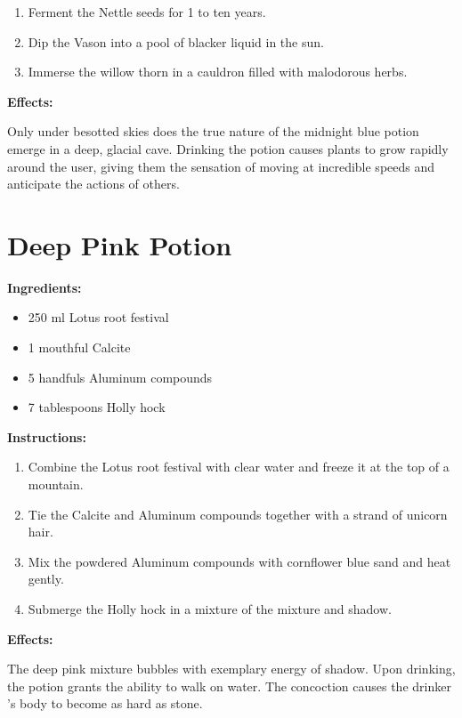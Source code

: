 \documentclass{article}
\begin{document}
\begin{enumerate}
  \item Ferment the Nettle seeds for 1 to ten years.
  \item Dip the Vason into a pool of blacker liquid in the sun.
  \item Immerse the willow thorn in a cauldron filled with malodorous herbs.
\end{enumerate}

\textbf{Effects:}

Only under besotted skies does the true nature of the midnight blue potion emerge in a deep, glacial cave. Drinking the potion causes plants to grow rapidly around the user, giving them the sensation of moving at incredible speeds and anticipate the actions of others.

\newpage
\section*{Deep Pink Potion}

\textbf{Ingredients:}

\begin{itemize}
  \item 250 ml Lotus root festival
  \item 1 mouthful Calcite
  \item 5 handfuls Aluminum compounds
  \item 7 tablespoons Holly hock
\end{itemize}

\textbf{Instructions:}

\begin{enumerate}
  \item Combine the Lotus root festival with clear water and freeze it at the top of a mountain.
  \item Tie the Calcite and Aluminum compounds together with a strand of unicorn hair.
  \item Mix the powdered Aluminum compounds with cornflower blue sand and heat gently.
  \item Submerge the Holly hock in a mixture of the mixture and shadow.
\end{enumerate}

\textbf{Effects:}

The deep pink mixture bubbles with exemplary energy of shadow. Upon drinking, the potion grants the ability to walk on water. The concoction causes the drinker 's body to become as hard as stone.
\end{document}

